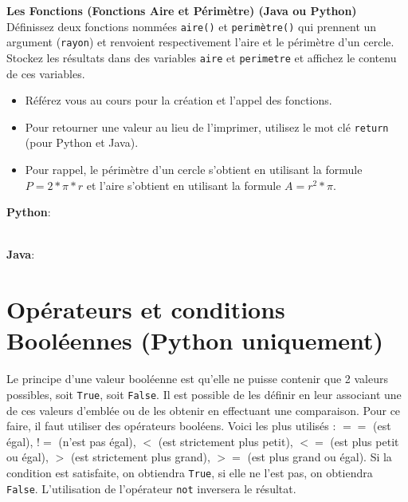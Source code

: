 \begin{Exercice}[5 minutes] \textbf{Les Fonctions (Fonctions Aire et Périmètre) (Java ou Python)}\\
    Définissez deux fonctions nommées \lstinline{aire()} et \lstinline{perimètre()} qui prennent un argument (\lstinline{rayon}) et renvoient respectivement l'aire et le périmètre d'un cercle. Stockez les résultats dans des variables \lstinline{aire} et \lstinline{perimetre} et affichez le contenu de ces variables.   \\
   
    \begin{conseil}
        \begin{itemize}
            \item Référez vous au cours pour la création et l'appel des fonctions.
            \item Pour retourner une valeur au lieu de l'imprimer, utilisez le mot clé \lstinline{return} (pour Python et Java).
            \item Pour rappel, le périmètre d'un cercle s'obtient en utilisant la formule $P = 2*\pi*r$ et l'aire s'obtient en utilisant la formule $A = r^2*\pi$.
        \end{itemize}        
    \end{conseil}
    \begin{solution}
        \textbf{Python}:
        
        
        \textbf{\\Java}:
        
    \end{solution}   
\end{Exercice} 


\newpage
\section{Opérateurs et conditions Booléennes (Python uniquement)}
Le principe d'une valeur booléenne est qu'elle ne puisse contenir que 2 valeurs possibles, soit \lstinline{True}, soit \lstinline{False}. Il est possible de les définir en leur associant une de ces valeurs d'emblée ou de les obtenir en effectuant une comparaison. Pour ce faire, il faut utiliser des opérateurs booléens. Voici les plus utilisés : $==$ (est égal), $!=$ (n'est pas égal), $<$ (est strictement plus petit), $<=$ (est plus petit ou égal), $>$ (est strictement plus grand), $>=$ (est plus grand ou égal). Si la condition est satisfaite, on obtiendra \lstinline{True}, si elle ne l'est pas, on obtiendra \lstinline{False}. L'utilisation de l'opérateur \lstinline{not} inversera le résultat.\\

